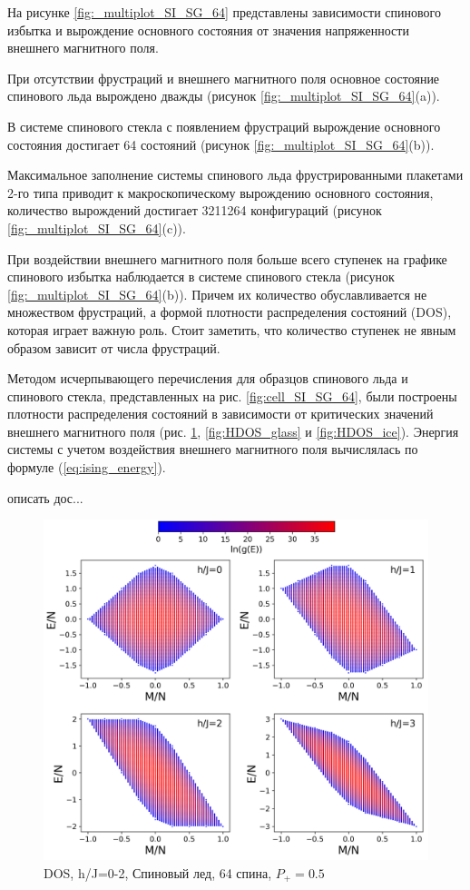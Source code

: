 \documentclass[utf8, babel, sor, jor, amsmath, amssymb, reprint]{elsarticle} %
\begin{document}
На рисунке \ref{fig:_multiplot_SI_SG_64} представлены зависимости спинового избытка и вырождение основного состояния от значения напряженности внешнего магнитного поля. 

При отсутствии фрустраций и внешнего магнитного поля основное состояние спинового льда вырождено дважды (рисунок \ref{fig:_multiplot_SI_SG_64}(a)).

В системе спинового стекла с появлением фрустраций вырождение основного состояния достигает 64 состояний (рисунок \ref{fig:_multiplot_SI_SG_64}(b)).

Максимальное заполнение системы спинового льда фрустрированными плакетами 2-го типа приводит к макроскопическому вырождению основного состояния, количество вырождений достигает 3211264 конфигураций (рисунок \ref{fig:_multiplot_SI_SG_64}(c)).



При воздействии внешнего магнитного поля больше всего ступенек на графике спинового избытка наблюдается в системе спинового стекла (рисунок \ref{fig:_multiplot_SI_SG_64}(b)). Причем их количество обуславливается не множеством фрустраций, а формой плотности распределения состояний (DOS), которая играет важную роль.
Стоит заметить, что количество ступенек не явным образом зависит от числа фрустраций.


Методом исчерпывающего перечисления для образцов спинового льда и спинового стекла, представленных на рис. \ref{fig:cell_SI_SG_64}, были построены плотности распределения состояний в зависимости от критических значений внешнего магнитного поля (рис. \ref{fig:HDOS_ice_1}, \ref{fig:HDOS_glass} и \ref{fig:HDOS_ice}).
Энергия системы с учетом воздействия внешнего магнитного поля вычислялась по формуле (\ref{eq:ising_energy}).

описать дос...


\begin{figure}[H]
	\centering
	\includegraphics[width=1\linewidth]{pictures/HDOS_SI_64_J0_1.png}
	\caption{DOS, h/J=0-2, Спиновый лед, 64 спина, $P_+ = 0.5$}
	\label{fig:HDOS_ice_1}
\end{figure}
\end{document}

